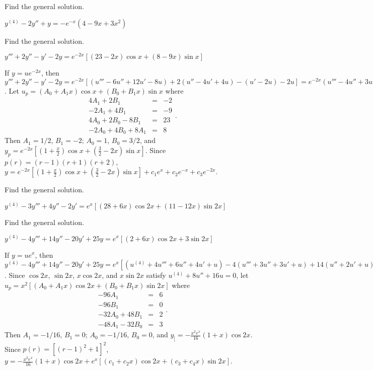 \documentclass{ximera}
\begin{document}
\begin{problem}\label{exer:9.3.65}  Find the general solution.

$y^{(4)}-2y''+y=-e^{-x}(4-9x+3x^2)$
\end{problem}

\begin{problem}\label{exer:9.3.66}   Find the general solution. 

$y'''+2y''-y'-2y=e^{-2x}\left[(23-2x)\cos
x+(8-9x)\sin x\right]$

\begin{solution}
If $y=ue^{-2x}$, then
$y'''+2y''-y'-2y=e^{-2x}[
(u'''-6u''+12u'-8u) +2(u''-4u'+4u) -(u'-2u) -2u]=
e^{-2x}(u'''-4u''+3u')$.
Let $u_p=(A_0+A_1x)\cos x+(B_0+B_1x)\sin x$ where
$$
\begin{array}{rcr}
4A_1+2B_1&=&-2\\
-2A_1+4B_1&=&-9\\
4A_0+2B_0-8B_1 &=&23\\
-2A_0+4B_0+8A_1&=&8
\end{array}.
$$
Then $A_1=1/2$, $B_1=-2$; $A_0=1$, $B_0=3/2$, and
 $y_p=e^{-2x}\left[\left(1+\frac{x}{2}\right)\cos
x+\left(\frac{3}{2}-2x\right)\sin x\right]$.
Since $p(r)=(r-1)(r+1)(r+2)$,
 $y=e^{-2x}{\left[\left(1+\frac{x}{2}\right)
\cos x+\left(\frac{3}{2}-2x\right)\sin x\right]}
+c_1e^x+c_2e^{-x}+c_3e^{-2x}$.
\end{solution}
\end{problem}

\begin{problem}\label{exer:9.3.67}   Find the general solution.

$y^{(4)}-3y'''+4y''-2y'=e^x\left[(28+6x)\cos
2x+(11-12x)\sin2x\right]$
\end{problem}

\begin{problem}\label{exer:9.3.68}   Find the general solution. 

$y^{(4)}-4y'''+14y''-20y'+25y=e^x\left[(2+6x)\cos
2x+3\sin2x\right]$

\begin{solution}
If $y=ue^x$, then
$y^{(4)}-4y'''+14y''-20y'+25y=e^x[
(u^{(4)}+4u'''+6u''+4u'+u) -4(u'''+3u''+3u'+u) +14(u''+2u'+u)
-20(u'+u) +25u
]=e^x(u^{(4)}+8u''+16u)$.
Since $\cos2x$, $\sin2x$, $x\cos2x$, and $x\sin2x$
satisfy $u^{(4)}+8u''+16u=0$,
let $u_p=x^2[(A_0+A_1x)\cos2x+(B_0+B_1x)\sin2x]$ where
$$
\begin{array}{rcr}
-96A_1&=&6\\
-96B_1&=&0\\
-32A_0+48B_1&=&2\\
-48A_1-32B_0&=&3
\end{array}.
$$
Then $A_1=-1/16$, $B_1=0$; $A_0=-1/16$, $B_0=0$, and
 $y_[=-\frac{x^2e^x}{16}(1+x)\cos2x$. Since
$p(r)=[(r-1)^2+1]^2$,
 $y=-\frac{x^2e^x}{16}(1+x)\cos2x
+e^x\left[(c_1+c_2x)\cos2x+(c_3+c_4x)\sin2x\right]$.
\end{solution}
\end{problem}
\end{document}
